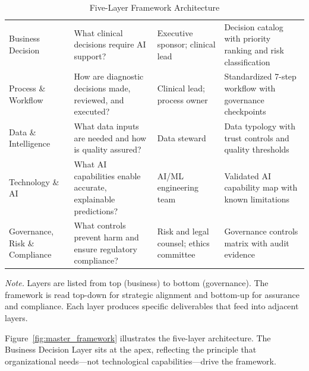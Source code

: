 \begin{table}[H]
\tablestripes
\small
\begin{tabularx}{\textwidth}{L L L L}
\toprule
{} &  &  &  \\
\midrule
Business Decision & What clinical decisions require AI support? & Executive sponsor; clinical lead & Decision catalog with priority ranking and risk classification \\
\addlinespace
Process \& Workflow & How are diagnostic decisions made, reviewed, and executed? & Clinical lead; process owner & Standardized 7-step workflow with governance checkpoints \\
\addlinespace
Data \& Intelligence & What data inputs are needed and how is quality assured? & Data steward & Data typology with trust controls and quality thresholds \\
\addlinespace
Technology \& AI & What AI capabilities enable accurate, explainable predictions? & AI/ML engineering team & Validated AI capability map with known limitations \\
\addlinespace
Governance, Risk \& Compliance & What controls prevent harm and ensure regulatory compliance? & Risk and legal counsel; ethics committee & Governance controls matrix with audit evidence \\
\bottomrule
\end{tabularx}
\caption{Five-Layer Framework Architecture}
\label{tab:framework_layers}
\vspace{0.5em}\noindent\textit{Note.} Layers are listed from top (business) to bottom (governance). The framework is read top-down for strategic alignment and bottom-up for assurance and compliance. Each layer produces specific deliverables that feed into adjacent layers.
\end{table}

Figure~\ref{fig:master_framework} illustrates the five-layer architecture. The Business Decision Layer sits at the apex, reflecting the principle that organizational needs---not technological capabilities---drive the framework.

